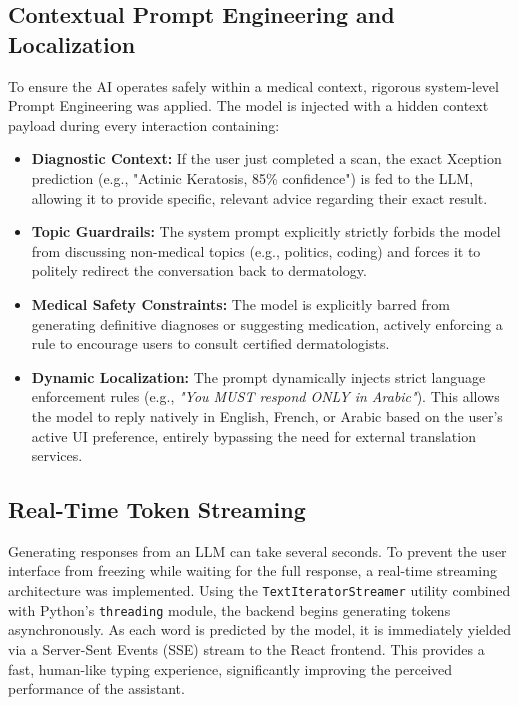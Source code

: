 \subsection{Contextual Prompt Engineering and Localization}
To ensure the AI operates safely within a medical context, rigorous system-level Prompt Engineering was applied. The model is injected with a hidden context payload during every interaction containing:
\begin{itemize}
	\item \textbf{Diagnostic Context:} If the user just completed a scan, the exact Xception prediction (e.g., "Actinic Keratosis, 85\% confidence") is fed to the LLM, allowing it to provide specific, relevant advice regarding their exact result.
	\item \textbf{Topic Guardrails:} The system prompt explicitly strictly forbids the model from discussing non-medical topics (e.g., politics, coding) and forces it to politely redirect the conversation back to dermatology.
	\item \textbf{Medical Safety Constraints:} The model is explicitly barred from generating definitive diagnoses or suggesting medication, actively enforcing a rule to encourage users to consult certified dermatologists.
	\item \textbf{Dynamic Localization:} The prompt dynamically injects strict language enforcement rules (e.g., \textit{"You MUST respond ONLY in Arabic"}). This allows the model to reply natively in English, French, or Arabic based on the user's active UI preference, entirely bypassing the need for external translation services.
\end{itemize}

\subsection{Real-Time Token Streaming}
Generating responses from an LLM can take several seconds. To prevent the user interface from freezing while waiting for the full response, a real-time streaming architecture was implemented. Using the \texttt{TextIteratorStreamer} utility combined with Python's \texttt{threading} module, the backend begins generating tokens asynchronously. As each word is predicted by the model, it is immediately yielded via a Server-Sent Events (SSE) stream to the React frontend. This provides a fast, human-like typing experience, significantly improving the perceived performance of the assistant.

